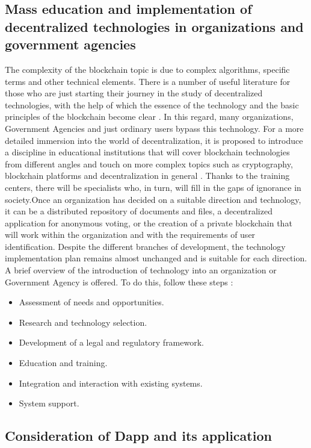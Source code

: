 \documentclass[10pt,conference,a4paper]{IEEEtran_EDM}
\begin{document}
\subsection{Mass education and implementation of decentralized technologies in organizations and government agencies }

The complexity of the blockchain topic is due to complex algorithms, specific terms and other technical elements. There is a number of useful literature for those who are just starting their journey in the study of decentralized technologies, with the help of which the essence of the technology and the basic principles of the blockchain become clear \cite{Kube}. In this regard, many organizations, Government Agencies and just ordinary users bypass this technology. For a more detailed immersion into the world of decentralization, it is proposed to introduce a discipline in educational institutions that will cover blockchain technologies from different angles and touch on more complex topics such as cryptography, blockchain platforms and decentralization in general \cite{Bashir}. Thanks to the training centers, there will be specialists who, in turn, will fill in the gaps of ignorance in society.Once an organization has decided on a suitable direction and technology, it can be a distributed repository of documents and files, a decentralized application for anonymous voting, or the creation of a private blockchain that will work within the organization and with the requirements of user identification. Despite the different branches of development, the technology implementation plan remains almost unchanged and is suitable for each direction. A brief overview of the introduction of technology into an organization or Government Agency is offered. To do this, follow these steps \cite{Talapina}:
\begin{itemize}
    \item Assessment of needs and opportunities.
    \item Research and technology selection.
    \item Development of a legal and regulatory framework.
    \item Education and training.
    \item Integration and interaction with existing systems.
    \item System support.
\end{itemize}

\subsection{Consideration of Dapp and its application}
\end{document}
